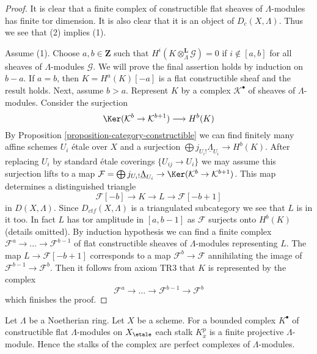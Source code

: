 \begin{proof}
It is clear that a finite complex of constructible
flat sheaves of $\Lambda$-modules has finite tor dimension.
It is also clear that it is an object of $D_c(X, \Lambda)$.
Thus we see that (2) implies (1).

\medskip\noindent
Assume (1). Choose $a, b \in \mathbf{Z}$ such that
$H^i(K \otimes_\Lambda^\mathbf{L} \mathcal{G}) = 0$ if
$i \not \in [a, b]$ for all sheaves of $\Lambda$-modules $\mathcal{G}$.
We will prove the final assertion holds by induction on $b - a$. If
$a = b$, then $K = H^a(K)[-a]$ is a flat constructible sheaf
and the result holds. Next, assume $b > a$. Represent $K$
by a complex $\mathcal{K}^\bullet$ of sheaves of $\Lambda$-modules.
Consider the surjection
$$
\Ker(\mathcal{K}^b \to \mathcal{K}^{b + 1})
\longrightarrow
H^b(K)
$$
By Proposition \ref{proposition-category-constructible}
we can find finitely many affine schemes $U_i$ \'etale over $X$ and a
surjection $\bigoplus j_{U_i!}\underline{\Lambda}_{U_i} \to H^b(K)$.
After replacing $U_i$ by standard \'etale coverings $\{U_{ij} \to U_i\}$
we may assume this surjection lifts to a map
$\mathcal{F} = \bigoplus j_{U_i!}\underline{\Lambda}_{U_i} \to
\Ker(\mathcal{K}^b \to \mathcal{K}^{b + 1})$.
This map determines a distinguished triangle
$$
\mathcal{F}[-b] \to K \to L \to \mathcal{F}[-b + 1]
$$
in $D(X, \Lambda)$. Since $D_{ctf}(X, \Lambda)$ is a triangulated
subcategory we see that $L$ is in it too. In fact $L$ has
tor amplitude in $[a, b - 1]$ as $\mathcal{F}$ surjects onto
$H^b(K)$ (details omitted). By induction hypothesis we can find
a finite complex $\mathcal{F}^a \to \ldots \to \mathcal{F}^{b - 1}$
of flat constructible sheaves of $\Lambda$-modules representing $L$.
The map $L \to \mathcal{F}[-b + 1]$ corresponds to a map
$\mathcal{F}^b \to \mathcal{F}$ annihilating the image
of $\mathcal{F}^{b - 1} \to \mathcal{F}^b$. Then it follows
from axiom TR3 that $K$ is represented by the complex
$$
\mathcal{F}^a \to \ldots \to \mathcal{F}^{b - 1} \to \mathcal{F}^b
$$
which finishes the proof.
\end{proof}

\begin{remark}
\label{remark-projective-each-degree}
Let $\Lambda$ be a Noetherian ring. Let $X$ be a scheme.
For a bounded complex $K^\bullet$ of constructible flat $\Lambda$-modules
on $X_\etale$
each stalk $K^p_{\overline{x}}$ is a finite projective $\Lambda$-module.
Hence the stalks of the complex are perfect complexes of $\Lambda$-modules.
\end{remark}

